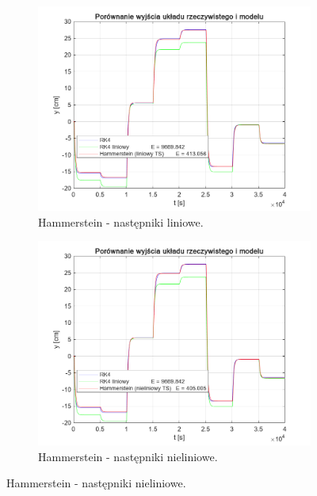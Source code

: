 \begin{figure}[b!]
\centering
\begin{subfigure}[b]{0.49\paperwidth}
\centering
\includegraphics[width=\linewidth]{pictures/HammersteinLinearModel_4}
\caption{Hammerstein - następniki liniowe.}
\end{subfigure}
\hfill
\begin{subfigure}[b]{0.49\paperwidth}
\centering
\includegraphics[width=\linewidth]{pictures/HammersteinNonlinearModel_4}
\caption{Hammerstein - następniki nieliniowe.}
\end{subfigure}
    
\vspace{0.5cm} %


\end{figure}
